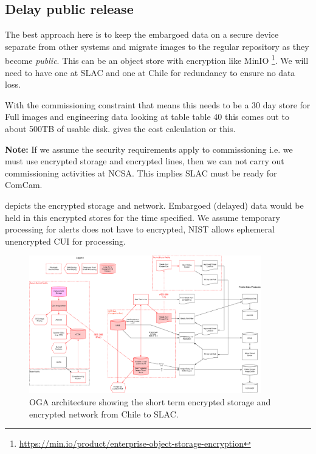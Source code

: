 
\subsection{Delay public release} \label{sec:3delay}

The best approach here is to keep the embargoed data on a secure device separate from other systems and migrate images to the regular repository as they become \emph{public}.
This can be an object store with encryption like MinIO \footnote{\url{ https://min.io/product/enterprise-object-storage-encryption}}.
We will need to have one at SLAC and one at Chile for redundancy to ensure no data loss.

With the commissioning constraint that means this needs to be a 30 day store  for Full images and engineering data looking at 
table table 40 this comes out to about 500TB of usable disk.
 gives the cost calculation or this.




{\bf Note:} If we assume the security requirements apply to commissioning i.e. we must use encrypted storage and encrypted lines, then we can not carry out commissioning activities at NCSA. This implies SLAC must be ready for ComCam.

 depicts the encrypted storage and network. Embargoed (delayed) data would be held in this encrypted stores for the time specified.
We assume temporary processing for alerts does not have to encrypted, NIST allows ephemeral unencrypted CUI for processing.

\begin{figure}
\begin{centering}
\includegraphics[width=0.9\textwidth]{OGA_Diagram}
	\caption{ OGA architecture  showing the short term encrypted storage and encrypted network from Chile to SLAC. \label{fig:arch}}
\end{centering}
\end{figure}
